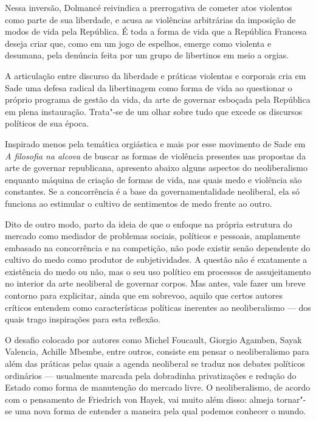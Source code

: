 Nessa inversão, Dolmancé reivindica a prerrogativa de cometer atos
violentos como parte de sua liberdade, e acusa as violências arbitrárias
da imposição de modos de vida pela República. É toda a forma de
vida que a República Francesa deseja criar que, como em um jogo de
espelhos, emerge como violenta e desumana, pela denúncia feita
por um grupo de libertinos em meio a orgias.

A articulação entre
discurso da liberdade e práticas violentas e corporais cria em Sade uma
defesa radical da libertinagem como forma de vida ao questionar o
próprio programa de gestão da vida, da arte de governar esboçada pela
República em plena instauração. Trata"-se de um olhar sobre tudo que
excede os discursos políticos de sua época.

\asterisc

Inspirado menos pela temática orgiástica e mais por esse movimento de
Sade em \emph{A filosofia na alcova} de buscar as formas de violência
presentes nas propostas da arte de governar republicana, apresento
abaixo alguns aspectos do neoliberalismo enquanto máquina de criação de
formas de vida, nas quais medo e violência são constantes. Se a
concorrência é a base da governamentalidade neoliberal, ela só funciona
ao estimular o cultivo de sentimentos de medo frente ao outro.

Dito de outro modo, parto da ideia de
que o enfoque na própria estrutura do mercado como mediador de problemas
sociais, políticos e pessoais, amplamente embasado na concorrência e na
competição, não pode existir senão dependente do cultivo do medo como
produtor de subjetividades. A questão não é exatamente a existência do
medo ou não, mas o seu uso político em processos de assujeitamento no
interior da arte neoliberal de governar corpos. Mas antes, vale fazer um
breve contorno para explicitar, ainda que em sobrevoo, aquilo que certos autores críticos entendem como características políticas inerentes ao neoliberalismo --- dos quais trago inspirações para esta reflexão.

\asterisc

O desafio colocado por autores como Michel Foucault, Giorgio Agamben,
Sayak Valencia, Achille Mbembe, entre outros, consiste em pensar o
neoliberalismo para além das práticas pelas quais a agenda neoliberal se
traduz nos debates políticos ordinários --- usualmente marcada pela
dobradinha privatizações e redução do Estado como
forma de manutenção do mercado livre. O neoliberalismo, de acordo com o pensamento de Friedrich von
Hayek, vai muito além disso: almeja tornar"-se uma nova forma de entender
a maneira pela qual podemos conhecer o mundo.

